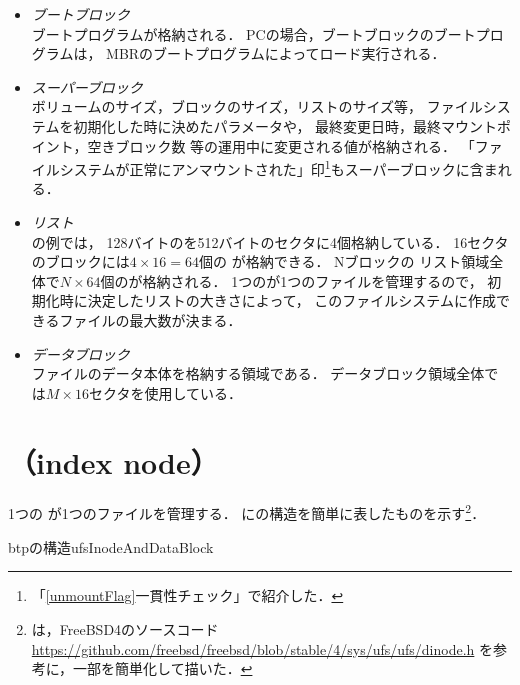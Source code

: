 \begin{itemize}
\item \emph{ブートブロック}\\
  ブートプログラムが格納される．
  PCの場合，ブートブロックのブートプログラムは，
  MBRのブートプログラムによってロード実行される．
\item \emph{スーパーブロック}\\
  ボリュームのサイズ，ブロックのサイズ，\inode リストのサイズ等，
  ファイルシステムを初期化した時に決めたパラメータや，
  最終変更日時，最終マウントポイント，空きブロック数
  等の運用中に変更される値が格納される．
  「ファイルシステムが正常にアンマウントされた」印\footnote{
    「\ref{unmountFlag}一貫性チェック」で紹介した．
  }もスーパーブロックに含まれる．
\item \emph{\inode リスト}\\
  の例では，
  128バイトの\inode を512バイトのセクタに4個格納している．
  16セクタのブロックには$4 \times 16 = 64$個の \inode が格納できる．
  Nブロックの \inode リスト領域全体で$N \times 64$個の\inode が格納される．
  1つの\inode が1つのファイルを管理するので，
  初期化時に決定した\inode リストの大きさによって，
  このファイルシステムに作成できるファイルの最大数が決まる．
\item \emph{データブロック}\\
  ファイルのデータ本体を格納する領域である．
  データブロック領域全体では$M \times 16$セクタを使用している．
\end{itemize}

\section{\inode （index node）}
1つの \inode が1つのファイルを管理する．
に\inode の構造を簡単に表したものを示す\footnote{
  は，FreeBSD4のソースコード
  \url{https://github.com/freebsd/freebsd/blob/stable/4/sys/ufs/ufs/dinode.h}
  を参考に，一部を簡単化して描いた．
}．

\begin{myfig}{btp}{\inode の構造}{ufsInodeAndDataBlock}
\end{myfig}


